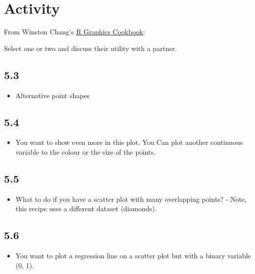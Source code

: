 \documentclass[
  letterpaper,
  DIV=11,
  numbers=noendperiod]{scrreprt}
\providecommand{\tightlist}{%
  \setlength{\itemsep}{0pt}\setlength{\parskip}{0pt}}\usepackage{longtable,booktabs,array}
\begin{document}
\section{Activity}\label{activity}

From Winston Chang's \href{https://r-graphics.org/}{R Graphics
Cookbook}:

Select one or two and discuss their utility with a partner.

\subsection{5.3}\label{section-7}

\begin{itemize}
\tightlist
\item
  Alternative point shapes
\end{itemize}

\subsection{5.4}\label{section-8}

\begin{itemize}
\tightlist
\item
  You want to show even more in this plot. You Can plot another
  continuous variable to the colour or the size of the points.
\end{itemize}

\subsection{5.5}\label{section-9}

\begin{itemize}
\tightlist
\item
  What to do if you have a scatter plot with many overlapping points? -
  Note, this recipe uses a different dataset (diamonds).
\end{itemize}

\subsection{5.6}\label{section-10}

\begin{itemize}
\tightlist
\item
  You want to plot a regression line on a scatter plot but with a binary
  variable (0, 1).
\end{itemize}
\end{document}
